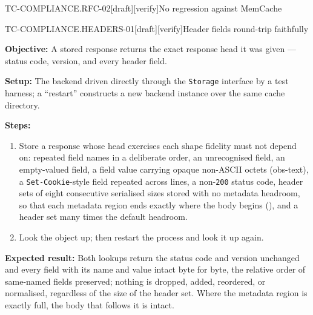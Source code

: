 \begin{requirement}{TC-COMPLIANCE.RFC-02}[draft][verify]{No regression against MemCache}


\end{requirement}

\begin{requirement}{TC-COMPLIANCE.HEADERS-01}[draft][verify]{Header fields round-trip faithfully}


  \textbf{Objective:} A stored response returns the exact response head it was
  given --- status code, version, and every header field.

  \textbf{Setup:} The backend driven directly through the \texttt{Storage}
  interface by a test harness; a ``restart'' constructs a new backend instance
  over the same cache directory.

  \textbf{Steps:}
  \begin{enumerate}
    \item Store a response whose head exercises each shape fidelity must not
      depend on: repeated field names in a deliberate order, an unrecognised
      field, an empty-valued field, a field value carrying opaque non-ASCII
      octets (obs-text), a \texttt{Set-Cookie}-style field repeated across
      lines, a non-\texttt{200} status code, header sets of eight consecutive
      serialised sizes stored with no metadata headroom, so that each
      metadata region ends exactly where the body begins
      (), and a header set many times the
      default headroom.
    \item Look the object up; then restart the process and look it up again.
  \end{enumerate}

  \textbf{Expected result:} Both lookups return the status code and version
  unchanged and every field with its name and value intact byte for byte, the
  relative order of same-named fields preserved; nothing is dropped, added,
  reordered, or normalised, regardless of the size of the header set. Where
  the metadata region is exactly full, the body that follows it is intact.



\end{requirement}

